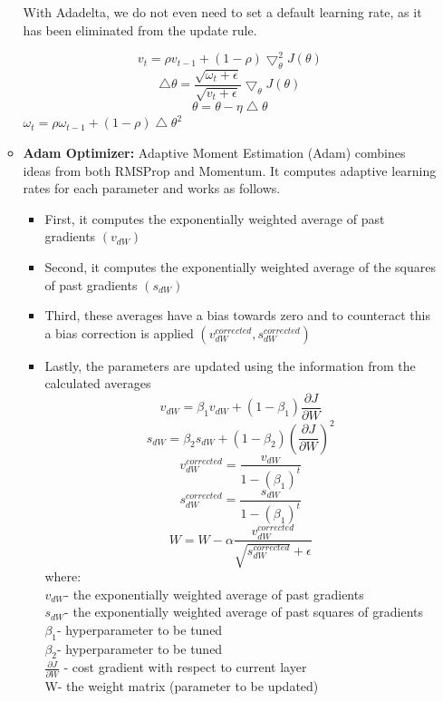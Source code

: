 \begin{itemize}
\begin{itemize}
    With Adadelta, we do not even need to set a default learning rate, as it has been eliminated from the update rule.
    
    \[
    v_{t}=\rho v_{t-1}+(1-\rho)\bigtriangledown_{\theta}^{2}J(\theta)
    \]
    \[
    \bigtriangleup\theta=\frac{\sqrt{\omega_{t}+\epsilon}}{\sqrt{v_{t}+\epsilon}}\bigtriangledown_{\theta}J(\theta)
    \]
    \[
    \theta=\theta-\eta\bigtriangleup\theta
    \]
    $\omega_{t}=\rho\omega_{t-1} + (1-\rho)\bigtriangleup\theta^{2}$
    \item \textbf{Adam Optimizer: } Adaptive Moment Estimation (Adam) combines ideas from both RMSProp and Momentum. It computes adaptive learning rates for each parameter and works as follows.
    \begin{itemize}
        \item First, it computes the exponentially weighted average of past gradients $(v_{dW})$
        \item Second, it computes the exponentially weighted average of the squares of past gradients $(s_{dW})$
        \item Third, these averages have a bias towards zero and to counteract this a bias correction is applied $(v_{dW}^{corrected}, s_{dW}^{corrected})$
        \item Lastly, the parameters are updated using the information from the calculated averages\\
        \[v_{dW}=\beta_{1}v_{dW}+(1-\beta_{1})\frac{\partial J}{\partial W}\]
        \[
        s_{dW}=\beta_{2}s_{dW}+(1-\beta_{2}) \left(\frac{\partial J}{\partial W}\right)^{2}
        \]
        \[
         v_{dW}^{corrected}=\frac{v_{dW}}{1-(\beta_{1})^{t}}
        \]
        \[
         s_{dW}^{corrected}=\frac{s_{dW}}{1-(\beta_{1})^{t}}
        \]
        \[
        W=W-\alpha\frac{v_{dW}^{corrected}}{\sqrt{s_{dW}^{corrected}} + \epsilon}
        \]
        where:\\
        $v_{dW}$-  the exponentially weighted average of past gradients\\
        $s_{dW}$- the exponentially weighted average of past squares of gradients\\
        $\beta_{1}$- hyperparameter to be tuned\\
        $\beta_{2}$- hyperparameter to be tuned\\
        $\frac{\partial J}{\partial W}$ - cost gradient with respect to current layer\\
        W- the weight matrix (parameter to be updated)\\

\end{itemize}
\end{itemize}
\end{itemize}
